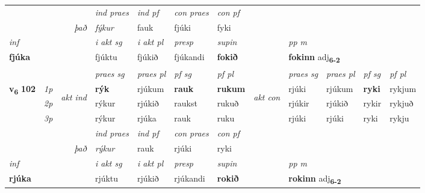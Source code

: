 \begin{longtable}[l]{X>{\footnotesize\itshape}llXXXXlXXXX}
   && &  \textit{ind praes} & \textit{ind pf} & \textit{con praes} & \textit{con pf} \\*
\multicolumn{3}{r}{\textit{það}} & fýkur & fauk & fjúki & fyki \\*

\cmidrule{4-7}
   {\textit{inf}} & &  & \textit{i akt sg} & \textit{i akt pl}   & \textit{presp} & \textit{supin}  && \textit{pp m} \\*
  {\textbf{fjúka}} & && fjúktu  & fjúkið   & fjúkandi &  \textbf{fokið}  && \multicolumn{2}{l}{\textbf{fokinn} adj\textbf{\textsubscript{6-2}}} \\*

\midrule

 & &   & \textit{praes sg}  & \textit{praes pl}    & \textit{ pf sg} & \textit{pf pl} & & \textit{praes sg}  & \textit{praes pl}    & \textit{pf sg} & \textit{pf pl }  \\ \cmidrule{4-7} \cmidrule{9-12}
 \multirow{2}{*}{{{\textbf{v{\textsubscript{6}}} \Large{\textbf{102}}}}}  & 1p & \multirow{3}{*}{\begin{turn}{90}\textit{akt ind}\end{turn}} & \textbf{rýk} & rjúkum & \textbf{rauk} & \textbf{rukum} & \multirow{3}{*}{\begin{turn}{90}\textit{akt con}\end{turn}} &rjúki & rjúkum & \textbf{ryki} & rykjum\\*
 & 2p &  &  rýkur  & rjúkið & raukst & rukuð & & rjúkir & rjúkið & rykir & rykjuð \\*
 & 3p &  & rýkur & rjúka & rauk & ruku & & rjúki & rjúki& ryki & rykju \\*
\cmidrule{4-7} \cmidrule{9-12}

   && &  \textit{ind praes} & \textit{ind pf} & \textit{con praes} & \textit{con pf} \\*
\multicolumn{3}{r}{\textit{það}} & rýkur & rauk & rjúki & ryki \\*

\cmidrule{4-7}
   {\textit{inf}} & &  & \textit{i akt sg} & \textit{i akt pl}   & \textit{presp} & \textit{supin}  && \textit{pp m} \\*
  {\textbf{rjúka}} & && rjúktu  & rjúkið   & rjúkandi &  \textbf{rokið}  && \multicolumn{2}{l}{\textbf{rokinn} adj\textbf{\textsubscript{6-2}}} \\*

\midrule


\end{longtable}
